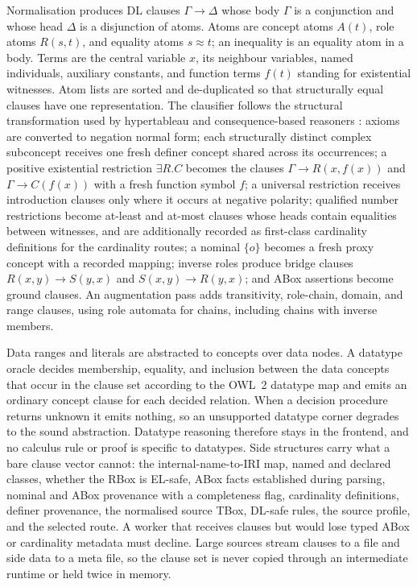 Normalisation produces DL clauses $\Gamma\rightarrow\Delta$ whose body
$\Gamma$ is a conjunction and whose head $\Delta$ is a disjunction of atoms.
Atoms are concept atoms $A(t)$, role atoms $R(s,t)$, and equality atoms
$s\approx t$; an inequality is an equality atom in a body.  Terms are the
central variable $x$, its neighbour variables, named individuals, auxiliary
constants, and function terms $f(t)$ standing for existential witnesses.  Atom
lists are sorted and de-duplicated so that structurally equal clauses have one
representation.  The clausifier follows the structural transformation used by
hypertableau and consequence-based reasoners
\cite{motik2009hypertableau,bate2018jair}: axioms are converted to negation
normal form; each structurally distinct complex subconcept receives one fresh
definer concept shared across its occurrences; a positive existential
restriction $\exists R.C$ becomes the clauses $\Gamma\rightarrow R(x,f(x))$ and
$\Gamma\rightarrow C(f(x))$ with a fresh function symbol $f$; a universal
restriction receives introduction clauses only where it occurs at negative
polarity; qualified number restrictions become at-least and at-most clauses
whose heads contain equalities between witnesses, and are additionally
recorded as first-class cardinality definitions for the cardinality routes; a
nominal $\{o\}$ becomes a fresh proxy concept with a recorded mapping; inverse
roles produce bridge clauses $R(x,y)\rightarrow S(y,x)$ and
$S(x,y)\rightarrow R(y,x)$; and ABox assertions become ground clauses.  An
augmentation pass adds transitivity, role-chain, domain, and range clauses,
using role automata for chains, including chains with inverse members.

Data ranges and literals are abstracted to concepts over data nodes.  A
datatype oracle decides membership, equality, and inclusion between the data
concepts that occur in the clause set according to the OWL~2 datatype map and
emits an ordinary concept clause for each decided relation.  When a decision
procedure returns unknown it emits nothing, so an unsupported datatype corner
degrades to the sound abstraction.  Datatype reasoning therefore stays in the
frontend, and no calculus rule or proof is specific to datatypes.  Side
structures carry what a bare clause vector cannot: the internal-name-to-IRI
map, named and declared classes, whether the RBox is EL-safe, ABox facts
established during parsing, nominal and ABox provenance with a completeness
flag, cardinality definitions, definer provenance, the normalised source TBox,
DL-safe rules, the source profile, and the selected route.  A worker that
receives clauses but would lose typed ABox or cardinality metadata must
decline.  Large sources stream clauses to a file and side data to a meta file,
so the clause set is never copied through an intermediate runtime or held
twice in memory.

